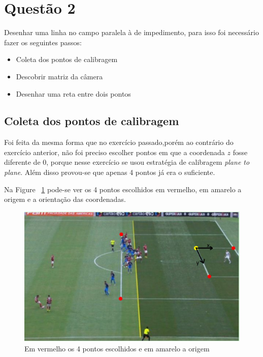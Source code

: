 \documentclass{article}
\begin{document}
\section{Questão 2}
    Desenhar uma linha no campo paralela à de impedimento, para isso foi necessário fazer os seguintes passos:
   \begin{itemize}
       \item Coleta dos pontos de calibragem
       \item Descobrir matriz da câmera
       \item Desenhar uma reta entre dois pontos
   \end{itemize}

    \subsection{Coleta dos pontos de calibragem}
    Foi feita da mesma forma que no exercício passado,porém ao contrário do exercício anterior, não foi preciso escolher pontos em que a coordenada \(z\) fosse diferente de 0, porque nesse exercício se usou estratégia de calibragem \textit{plane to plane}. Além disso provou-se que apenas 4 pontos já era o suficiente.

    Na Figure ~\ref{fig:maracana2Pontos} pode-se ver os 4 pontos escolhidos em vermelho, em amarelo a origem e a orientação das coordenadas.
        \begin{figure}[h!]
        \centering
        \includegraphics[scale=0.6]{maracana2Pontos.PNG}
        \caption{Em vermelho os 4 pontos escolhidos e em amarelo a origem}
        \label{fig:maracana2Pontos}
        \end{figure}
\end{document}
